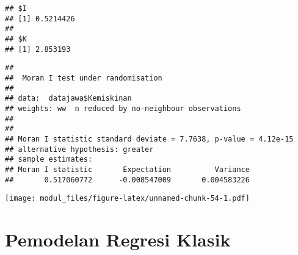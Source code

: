 \documentclass[
]{book}
\newenvironment{Shaded}{\begin{snugshade}}{\end{snugshade}}
\newcommand{\DataTypeTok}[1]{\textcolor[rgb]{0.13,0.29,0.53}{#1}}
\newcommand{\KeywordTok}[1]{\textcolor[rgb]{0.13,0.29,0.53}{\textbf{#1}}}
\newcommand{\NormalTok}[1]{#1}
\newcommand{\OperatorTok}[1]{\textcolor[rgb]{0.81,0.36,0.00}{\textbf{#1}}}
\newcommand{\StringTok}[1]{\textcolor[rgb]{0.31,0.60,0.02}{#1}}
\begin{document}
\begin{Shaded}
\end{Shaded}

\begin{verbatim}
## $I
## [1] 0.5214426
## 
## $K
## [1] 2.853193
\end{verbatim}

\begin{Shaded}
\end{Shaded}

\begin{verbatim}
## 
##  Moran I test under randomisation
## 
## data:  datajawa$Kemiskinan  
## weights: ww  n reduced by no-neighbour observations
##   
## 
## Moran I statistic standard deviate = 7.7638, p-value = 4.12e-15
## alternative hypothesis: greater
## sample estimates:
## Moran I statistic       Expectation          Variance 
##       0.517060772      -0.008547009       0.004583226
\end{verbatim}

\begin{Shaded}
\end{Shaded}

\texttt{[image: modul\_files/figure-latex/unnamed-chunk-54-1.pdf]}

\hypertarget{pemodelan-regresi-klasik}{%
\section{Pemodelan Regresi Klasik}\label{pemodelan-regresi-klasik}}
\end{document}

